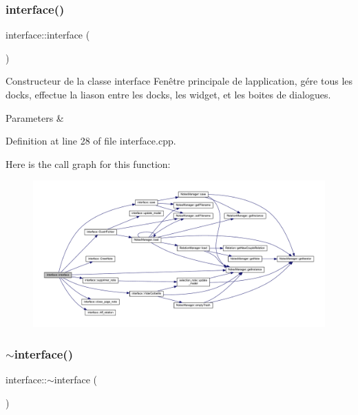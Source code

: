 \subsubsection{\texorpdfstring{interface()}{interface()}}
{\footnotesize\ttfamily interface\+::interface (\begin{DoxyParamCaption}{ }\end{DoxyParamCaption})}



Constructeur de la classe interface Fenêtre principale de l\textquotesingle{}application, gére tous les docks, effectue la liason entre les docks, les widget, et les boites de dialogues. 


\begin{DoxyParams}{Parameters}
{\em } & \\
\hline
\end{DoxyParams}


Definition at line 28 of file interface.\+cpp.

Here is the call graph for this function\+:\nopagebreak
\begin{figure}[H]
\begin{center}
\leavevmode
\includegraphics[width=350pt]{classinterface_a13e0ee4b9df1714d747d62ec46220c55_cgraph}
\end{center}
\end{figure}
\mbox{\label{classinterface_a8511f28c5bc5d3c24a24e9aaef4db502}} 
\subsubsection{\texorpdfstring{$\sim$interface()}{~interface()}}
{\footnotesize\ttfamily interface\+::$\sim$interface (\begin{DoxyParamCaption}{ }\end{DoxyParamCaption})}



